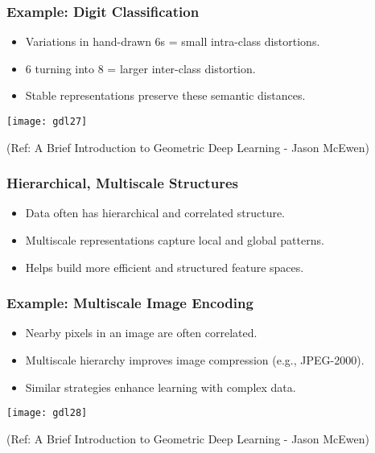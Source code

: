 \begin{frame}[fragile]\frametitle{Example: Digit Classification}
  \begin{itemize}
    \item Variations in hand-drawn 6s = small intra-class distortions.
    \item 6 turning into 8 = larger inter-class distortion.
    \item Stable representations preserve these semantic distances.
  \end{itemize}
  
\begin{center}
\texttt{[image: gdl27]}

{\tiny (Ref: A Brief Introduction to Geometric Deep Learning - Jason McEwen)}
\end{center}
    
\end{frame}

\begin{frame}[fragile]\frametitle{Hierarchical, Multiscale Structures}
  \begin{itemize}
    \item Data often has hierarchical and correlated structure.
    \item Multiscale representations capture local and global patterns.
    \item Helps build more efficient and structured feature spaces.
  \end{itemize}
\end{frame}

\begin{frame}[fragile]\frametitle{Example: Multiscale Image Encoding}
  \begin{itemize}
    \item Nearby pixels in an image are often correlated.
    \item Multiscale hierarchy improves image compression (e.g., JPEG-2000).
    \item Similar strategies enhance learning with complex data.
  \end{itemize}
  
\begin{center}
\texttt{[image: gdl28]}

{\tiny (Ref: A Brief Introduction to Geometric Deep Learning - Jason McEwen)}
\end{center}  
\end{frame}




